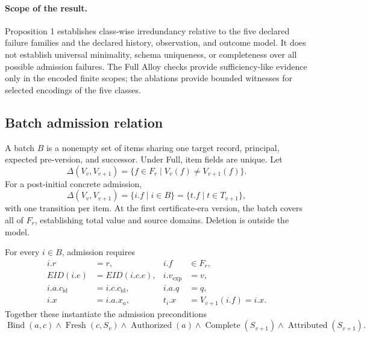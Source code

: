 \paragraph{Scope of the result.}
Proposition 1 establishes class-wise irredundancy relative to the five declared failure families and the declared history, observation, and outcome model. It does not establish universal minimality, schema uniqueness, or completeness over all possible admission failures. The Full Alloy checks provide sufficiency-like evidence only in the encoded finite scopes; the ablations provide bounded witnesses for selected encodings of the five classes.

\subsection{Batch admission relation}

A batch $B$ is a nonempty set of items sharing one target record, principal, expected pre-version, and successor. Under Full, item fields are unique. Let
\begin{equation}
\Delta(V_v,V_{v+1})=\{f\in F_r\mid V_v(f)\neq V_{v+1}(f)\}.
\end{equation}
For a post-initial concrete admission,
\begin{equation}
\Delta(V_v,V_{v+1})=\{i.f\mid i\in B\}=\{t.f\mid t\in T_{v+1}\},
\label{eq:changed-fields}
\end{equation}
with one transition per item. At the first certificate-era version, the batch covers all of $F_r$, establishing total value and source domains. Deletion is outside the model.

For every $i\in B$, admission requires
\begin{align}
i.r &= r, & i.f&\in F_r,\nonumber\\
EID(i.e) &= EID(i.c.e), & i.v_{\mathrm{exp}}&=v,\nonumber\\
i.a.c_{\mathrm{id}}&=i.c.c_{\mathrm{id}}, & i.a.q&=q,\nonumber\\
i.x&=i.a.x_a, & t_i.x&=V_{v+1}(i.f)=i.x.
\label{eq:item-bindings}
\end{align}
Together these instantiate the admission preconditions
\begin{equation}
\operatorname{Bind}(a,c)\land\operatorname{Fresh}(c,S_v)\land
\operatorname{Authorized}(a)\land\operatorname{Complete}(S_{v+1})\land
\operatorname{Attributed}(S_{v+1}).
\end{equation}

